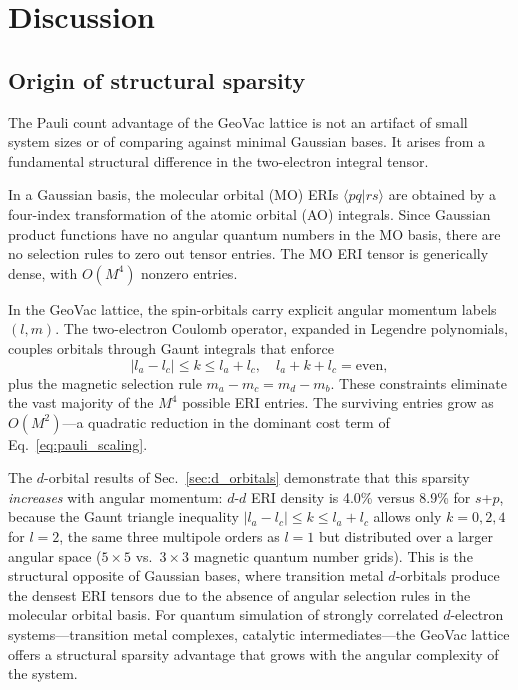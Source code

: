 \documentclass[aps,pra,twocolumn,superscriptaddress,longbibliography]{revtex4-2}
\begin{document}
\section{Discussion}
\label{sec:discussion}

\subsection{Origin of structural sparsity}
\label{sec:origin}

The Pauli count advantage of the GeoVac lattice is not an artifact of
small system sizes or of comparing against minimal Gaussian bases.  It
arises from a fundamental structural difference in the two-electron
integral tensor.

In a Gaussian basis, the molecular orbital (MO) ERIs
$\langle pq | rs \rangle$ are obtained by a four-index transformation of
the atomic orbital (AO) integrals.  Since Gaussian product functions have
no angular quantum numbers in the MO basis, there are no selection rules
to zero out tensor entries.  The MO ERI tensor is generically dense,
with $O(M^4)$ nonzero entries.

In the GeoVac lattice, the spin-orbitals carry explicit angular momentum
labels $(l, m)$.  The two-electron Coulomb operator, expanded in Legendre
polynomials, couples orbitals through Gaunt integrals that enforce
\begin{equation}
  |l_a - l_c| \le k \le l_a + l_c, \quad
  l_a + k + l_c = \text{even},
\end{equation}
plus the magnetic selection rule $m_a - m_c = m_d - m_b$.  These
constraints eliminate the vast majority of the $M^4$ possible ERI entries.
The surviving entries grow as $O(M^2)$---a quadratic reduction in the
dominant cost term of Eq.~\eqref{eq:pauli_scaling}.

The $d$-orbital results of Sec.~\ref{sec:d_orbitals} demonstrate that
this sparsity \emph{increases} with angular momentum: $d$-$d$ ERI
density is 4.0\% versus 8.9\% for $s$+$p$, because the Gaunt triangle
inequality $|l_a - l_c| \le k \le l_a + l_c$ allows only $k = 0, 2, 4$
for $l = 2$, the same three multipole orders as $l = 1$ but distributed
over a larger angular space ($5 \times 5$ vs.\ $3 \times 3$ magnetic
quantum number grids).  This is the structural opposite of Gaussian
bases, where transition metal $d$-orbitals produce the densest ERI
tensors due to the absence of angular selection rules in the molecular
orbital basis.  For quantum simulation of strongly correlated $d$-electron
systems---transition metal complexes, catalytic intermediates---the
GeoVac lattice offers a structural sparsity advantage that grows with
the angular complexity of the system.
\end{document}
